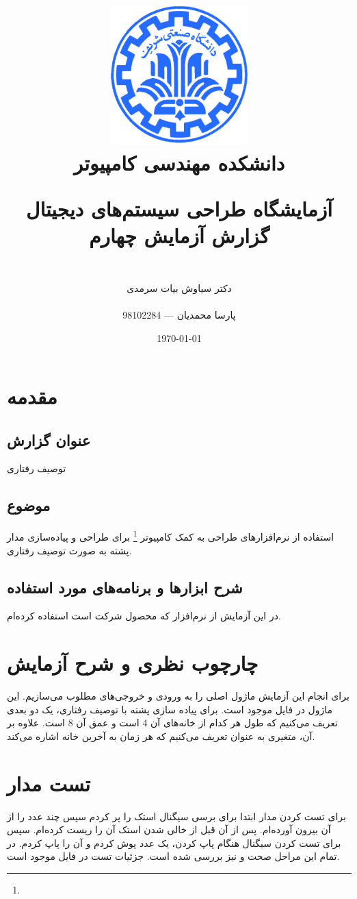 \documentclass[fleqn]{article}
\title{
\includegraphics[width=0.4\textwidth]{sharif.png}\\
\normalsize{دانشکده مهندسی کامپیوتر}\\
\vspace{1cm}
	
\huge{آزمایشگاه طراحی سیستم‌های دیجیتال}
\\
\Large{گزارش آزمایش چهارم}
\\
}
\author{
\\
دکتر سیاوش بیات سرمدی
\\
\\
پارسا محمدیان --- 98102284
}
\date{\today}
\begin{document}
\clearpage\maketitle
\thispagestyle{empty}

\newpage

\pagestyle{fancy}



\tableofcontents

\setcounter{page}{1}

\newpage

\section{مقدمه}

\subsection*{عنوان گزارش}
توصیف رفتاری
\subsection*{موضوع}
استفاده از نرم‌افزارهای طراحی به کمک کامپیوتر \footnote{} برای طراحی 
و پیاده‌سازی مدار پشته به صورت توصیف رفتاری.
\subsection*{شرح ابزارها و برنامه‌های مورد استفاده}
در این آزمایش از نرم‌افزار  که محصول شرکت  است 
استفاده کرده‌ام.

\section{چارچوب نظری و شرح آزمایش}
برای انجام این آزمایش ماژول اصلی را به ورودی و خروجی‌های مطلوب می‌سازیم. این 
ماژول در فایل 
موجود است. برای پیاده سازی پشته با توصیف رفتاری، یک 
دو بعدی تعریف می‌کنیم که طول هر کدام از خانه‌های آن 4 است و عمق آن 8 است. 
علاوه بر آن، متغیری به عنوان 
تعریف می‌کنیم که هر زمان به آخرین خانه  اشاره می‌کند.

\section{تست مدار}
برای تست کردن مدار ابتدا برای برسی سیگنال  استک را پر کردم سپس چند 
عدد را از آن بیرون 
آورده‌ام. پس از آن قبل از خالی شدن استک آن را ریست کرده‌ام. سپس برای تست کردن 
سیگنال  هنگام پاپ کردن، یک عدد پوش کردم و آن را پاپ کردم. در تمام 
این مراحل صحت  و  نیز بررسی شده است. جزئیات تست در 
فایل 
موجود است.
\end{document}
